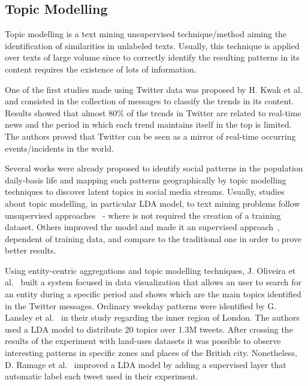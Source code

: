 \subsection{Topic Modelling}

Topic modelling is a text mining unsupervised technique/method aiming the identification of similarities in unlabeled texts. Usually, this technique is applied over texts of large volume since to correctly identify the resulting patterns in its content requires the existence of lots of information.

One of the first studies made using Twitter data was proposed by H. Kwak et al.~\cite{kwak2010twitter} and consisted in the collection of messages to classify the trends in its content. Results showed that almost 80\% of the trends in Twitter are related to real-time news and the period in which each trend maintains itself in the top is limited. The authors proved that Twitter can be seen as a mirror of real-time occurring events/incidents in the world.

Several works were already proposed to identify social patterns in the population daily-basis life and mapping such patterns geographically by topic modelling techniques to discover latent topics in social media streams. Usually, studies about topic modelling, in particular LDA model, to text mining problems follow unsupervised approaches~\cite{lansley2016geography,oliveira2016sentibubbles} - where is not required the creation of a training dataset. Others improved the model and made it an supervised approach~\cite{ramage2010characterizing}, dependent of training data, and compare to the traditional one in order to prove better results.

Using entity-centric aggregations and topic modelling techniques, J. Oliveira et al.~\cite{oliveira2016sentibubbles} built a system focused in data visualization that allows an user to search for an entity during a specific period and shows which are the main topics identified in the Twitter messages.  Ordinary weekday patterns were identified by G. Lansley et al.~\cite{lansley2016geography} in their study regarding the inner region of London. The authors used a LDA model to distribute 20 topics over 1.3M tweets. After crossing the results of the experiment with land-uses datasets it was possible to observe interesting patterns in specific zones and places of the British city. Nonetheless, D. Ramage et al.~\cite{ramage2010characterizing} improved a LDA model by adding a supervised layer that automatic label each tweet used in their experiment.

